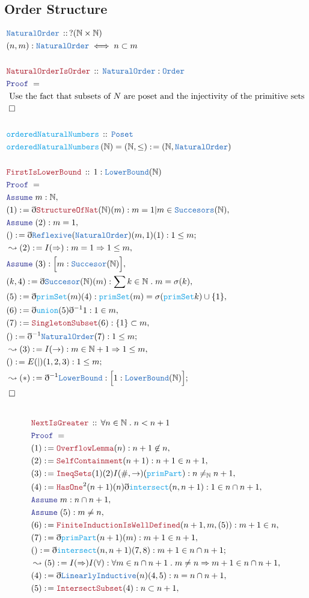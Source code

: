 \documentclass[12pt]{scrartcl}
\newcommand{\TYPE}[1]{\textcolor{NavyBlue}{\mathtt{#1}}}
\newcommand{\FUNC}[1]{\textcolor{Cerulean}{\mathtt{#1}}}
\newcommand{\LOGIC}[1]{\textcolor{Blue}{\mathtt{#1}}}
\newcommand{\THM}[1]{\textcolor{Maroon}{\mathtt{#1}}}
\renewcommand{\.}{\; . \;}
\newcommand{\de}{: \kern 0.1pc =}
\newcommand{\Act}[1]{\left( #1 \right)}
\newcommand{\Theorem}[2]{& \THM{#1} \, :: \, #2 \\ & \Proof = \\ }
\newcommand{\DeclareType}[2]{& \TYPE{#1} \, :: \, #2 \\}
\newcommand{\DefineType}[3]{& #1 : \TYPE{#2} \iff #3 \\}
\newcommand{\DeclareFunc}[2]{& \FUNC{#1} \, :: \, #2 \\}
\newcommand{\DefineNamedFunc}[4]{&  \FUNC{#1}\Act{#2} = #3 \de #4 \\}
\newcommand{\Page}[1]{ \begin{align*} #1 \end{align*}   }
\newcommand{ \bd }{ \ByDef }
\newcommand{\Nat}{\mathbb{N} }
\newcommand{\Say}[3]{& #1 \de #2 : #3, \\}
\newcommand{\Conclude}[3]{& #1 \de #2 : #3; \\}
\newcommand{\Derive}[3]{& \leadsto #1 \de #2 : #3, \\}
\newcommand{\DeriveConclude}[3]{& \leadsto #1 \de #2 : #3 ; \\}
\newcommand{\Assume}[2]{& \LOGIC{Assume} \; #1 : #2, \\}
\newcommand{\QED}{\; \square}
\newcommand{\EndProof}{& \QED \\}
\newcommand{\ByDef}{\eth}
\newcommand{\Proof}{\LOGIC{Proof} \; }
\begin{document}
\subsection{Order Structure}
\Page{
	\DeclareType{NaturalOrder}{?(\Nat \times \Nat) }
	\DefineType{(n,m)}{NaturalOrder}{n \subset m}
	\\
	\Theorem{NaturalOrderIsOrder}{  \TYPE{NaturalOrder} : \TYPE{Order}}
	& \text{ Use the fact that subsets of $N$ are poset and the injectivity of the primitive sets} \\
	\EndProof
	\\
	\DeclareFunc{orderedNaturalNumbers}{ \TYPE{Poset} }
	\DefineNamedFunc{orderedNaturalNumbers}{\Nat}{(\Nat,\le)}{(\Nat,\TYPE{NaturalOrder})}
	\\	
	\Theorem{FirstIsLowerBound}{ 1 : \TYPE{LowerBound}(\Nat)}
	\Assume{m}{\Nat}
	\Say{(1)}{\bd \THM{StructureOfNat}(\Nat)(m)}{ m = 1 | m \in \TYPE{Succesors}(\Nat)}
	\Assume{(2)}{m = 1}
	\Conclude{()}{\bd \TYPE{Reflexive}(\TYPE{NaturalOrder})(m,1)(1)}{1 \le m}
	\Derive{(2)}{ I(\Rightarrow) }{ m = 1 \Rightarrow 1 \le m  }
	\Assume{(3)}{\Big[m : \TYPE{Succesor}(\Nat)\Big] }
	\Say{(k,4)}{ \bd \TYPE{Succesor}(\Nat)(m) }{ \sum k \in \Nat \. m = \sigma(k)}
	\Say{(5)}{\bd \FUNC{primSet}(m)(4)}{\FUNC{primSet}(m) = \sigma(\FUNC{primSet}{k}) \cup \{1\} }
	\Say{(6)}{\bd \FUNC{union}(5)\bd^{-1}1 }{1 \in m }
	\Say{(7)}{\THM{SingletonSubset}(6)}{\{1\} \subset m}
	\Conclude{()}{\bd^{-1} \TYPE{NaturalOrder}(7)}{ 1 \le m  }
	\Derive{(3)}{I(\rightarrow)}{m \in \Nat + 1 \Rightarrow 1 \le m}
	\Conclude{()}{E(|)(1,2,3)}{1 \le m }
	\DeriveConclude{(*)}{\bd^{-1} \TYPE{LowerBound}}{\Big[1 : \TYPE{LowerBound}(\Nat)\Big]}
	\EndProof
        \\
}\Page{	
	\Theorem{NextIsGreater}{\forall n \in \Nat \. n < n + 1}
	\Say{(1)}{\THM{OverflowLemma}(n )}{n  + 1 \not \in n  }
	\Say{(2)}{\THM{SelfContainment}(n + 1 )}{ n  + 1 \in n + 1  }
	\Say{(3)}{\THM{IneqSets}(1)(2)I(\#,\to)(\FUNC{primPart})}{ n  \neq_{\Nat} n + 1   }
	\Say{(4)}{\THM{HasOne}^{2}(n + 1 )(n)\bd \FUNC{intersect}(n,n +1)}{ 1 \in n \cap n + 1  }
	\Assume{m}{n \cap n + 1 }
	\Assume{(5)}{ m \neq n  }
	\Say{(6)}{\THM{FiniteInductionIsWellDefined}(n+1,m,(5))}{ m + 1 \in n }
	\Say{(7)}{\bd \FUNC{primPart}(n+1)(m)}{ m + 1 \in n + 1   }
	\Conclude{()}{ \bd \FUNC{intersect}(n,n+1)(7,8)}{m + 1 \in n \cap n + 1}
	\Derive{(5)}{I(\Rightarrow)I(\forall)}{\forall m \in n \cap n + 1 \. m \neq n \Rightarrow m + 1 \in n \cap n + 1 }
	\Say{(4)}{\bd \TYPE{LinearlyInductive}(n)(4,5)}{n = n \cap n + 1}
	\Say{(5)}{\THM{IntersectSubset}(4)}{n \subset n + 1}
}
\end{document}
